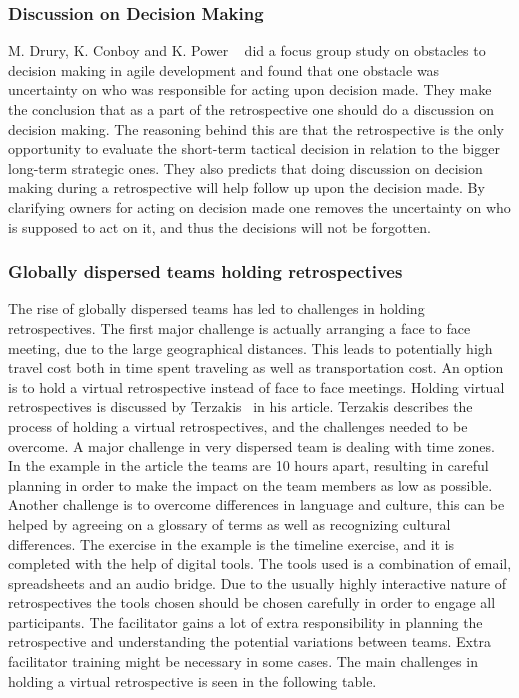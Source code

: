 \documentclass[12pt]{article}
\begin{document}
\subsubsection{Discussion on Decision Making}
M. Drury, K. Conboy and K. Power ~\cite{Drury2012} did a focus group study on obstacles to decision making in agile development and found that one obstacle was uncertainty on who was responsible for acting upon decision made. They make the conclusion that as a part of the retrospective one should do a discussion on decision making. The reasoning behind this are that the retrospective is the only opportunity to evaluate the short-term tactical decision in relation to the bigger long-term strategic ones. They also predicts that doing discussion on decision making during a retrospective will help follow up upon the decision made. By clarifying owners for acting on decision made one removes the uncertainty on who is supposed to act on it, and thus the decisions will not be forgotten. 

\subsubsection{Globally dispersed teams holding retrospectives}
The rise of globally dispersed teams has led to challenges in holding retrospectives. The first major challenge is actually arranging a face to face meeting, due to the large geographical distances. This leads to potentially high travel cost both in time spent traveling as well as transportation cost. An option is to hold a virtual retrospective instead of face to face meetings. Holding virtual retrospectives is discussed by Terzakis~\cite{Terzakis2011} in his article. Terzakis describes the process of holding a virtual retrospectives, and the challenges needed to be overcome. A major challenge in very dispersed team is dealing with time zones. In the example in the article the teams are 10 hours apart, resulting in careful planning in order to make the impact on the team members as low as possible. Another challenge is to overcome differences in language and culture, this can be helped by agreeing on a glossary of terms as well as recognizing cultural differences. The exercise in the example is the timeline exercise, and it is completed with the help of digital tools. The tools used is a combination of email, spreadsheets and an audio bridge. Due to the usually highly interactive nature of retrospectives the tools chosen should be chosen carefully in order to engage all participants. The facilitator gains a lot of extra responsibility in planning the retrospective and understanding the potential variations between teams. Extra facilitator training might be necessary in some cases. The main challenges in holding a virtual retrospective is seen in the following table.
\end{document}
